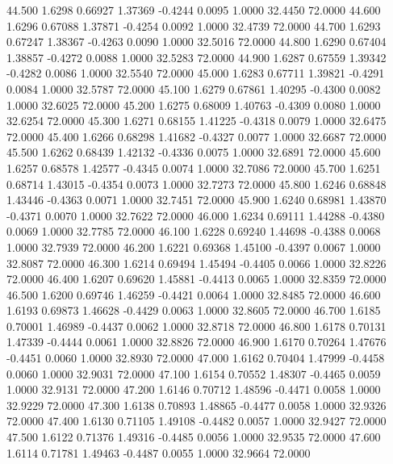   44.500   1.6298   0.66927   1.37369  -0.4244   0.0095   1.0000  32.4450  72.0000
  44.600   1.6296   0.67088   1.37871  -0.4254   0.0092   1.0000  32.4739  72.0000
  44.700   1.6293   0.67247   1.38367  -0.4263   0.0090   1.0000  32.5016  72.0000
  44.800   1.6290   0.67404   1.38857  -0.4272   0.0088   1.0000  32.5283  72.0000
  44.900   1.6287   0.67559   1.39342  -0.4282   0.0086   1.0000  32.5540  72.0000
  45.000   1.6283   0.67711   1.39821  -0.4291   0.0084   1.0000  32.5787  72.0000
  45.100   1.6279   0.67861   1.40295  -0.4300   0.0082   1.0000  32.6025  72.0000
  45.200   1.6275   0.68009   1.40763  -0.4309   0.0080   1.0000  32.6254  72.0000
  45.300   1.6271   0.68155   1.41225  -0.4318   0.0079   1.0000  32.6475  72.0000
  45.400   1.6266   0.68298   1.41682  -0.4327   0.0077   1.0000  32.6687  72.0000
  45.500   1.6262   0.68439   1.42132  -0.4336   0.0075   1.0000  32.6891  72.0000
  45.600   1.6257   0.68578   1.42577  -0.4345   0.0074   1.0000  32.7086  72.0000
  45.700   1.6251   0.68714   1.43015  -0.4354   0.0073   1.0000  32.7273  72.0000
  45.800   1.6246   0.68848   1.43446  -0.4363   0.0071   1.0000  32.7451  72.0000
  45.900   1.6240   0.68981   1.43870  -0.4371   0.0070   1.0000  32.7622  72.0000
  46.000   1.6234   0.69111   1.44288  -0.4380   0.0069   1.0000  32.7785  72.0000
  46.100   1.6228   0.69240   1.44698  -0.4388   0.0068   1.0000  32.7939  72.0000
  46.200   1.6221   0.69368   1.45100  -0.4397   0.0067   1.0000  32.8087  72.0000
  46.300   1.6214   0.69494   1.45494  -0.4405   0.0066   1.0000  32.8226  72.0000
  46.400   1.6207   0.69620   1.45881  -0.4413   0.0065   1.0000  32.8359  72.0000
  46.500   1.6200   0.69746   1.46259  -0.4421   0.0064   1.0000  32.8485  72.0000
  46.600   1.6193   0.69873   1.46628  -0.4429   0.0063   1.0000  32.8605  72.0000
  46.700   1.6185   0.70001   1.46989  -0.4437   0.0062   1.0000  32.8718  72.0000
  46.800   1.6178   0.70131   1.47339  -0.4444   0.0061   1.0000  32.8826  72.0000
  46.900   1.6170   0.70264   1.47676  -0.4451   0.0060   1.0000  32.8930  72.0000
  47.000   1.6162   0.70404   1.47999  -0.4458   0.0060   1.0000  32.9031  72.0000
  47.100   1.6154   0.70552   1.48307  -0.4465   0.0059   1.0000  32.9131  72.0000
  47.200   1.6146   0.70712   1.48596  -0.4471   0.0058   1.0000  32.9229  72.0000
  47.300   1.6138   0.70893   1.48865  -0.4477   0.0058   1.0000  32.9326  72.0000
  47.400   1.6130   0.71105   1.49108  -0.4482   0.0057   1.0000  32.9427  72.0000
  47.500   1.6122   0.71376   1.49316  -0.4485   0.0056   1.0000  32.9535  72.0000
  47.600   1.6114   0.71781   1.49463  -0.4487   0.0055   1.0000  32.9664  72.0000
